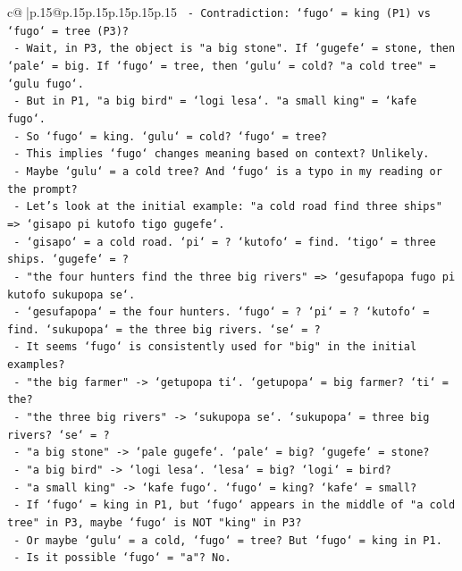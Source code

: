\documentclass{article}
\begin{document}
{\begin{supertabular}{c@{$\;$}|p{.15\linewidth}@{}p{.15\linewidth}p{.15\linewidth}p{.15\linewidth}p{.15\linewidth}p{.15\linewidth}}
{{{\texttt{  {-} Contradiction: `fugo` = king (P1) vs `fugo` = tree (P3)?} \\
\texttt{  {-} Wait, in P3, the object is "a big stone". If `gugefe` = stone, then `pale` = big. If `fugo` = tree, then `gulu` = cold? "a cold tree" = `gulu fugo`.} \\
\texttt{  {-} But in P1, "a big bird" = `logi lesa`. "a small king" = `kafe fugo`.} \\
\texttt{  {-} So `fugo` = king. `gulu` = cold? `fugo` = tree?} \\
\texttt{  {-} This implies `fugo` changes meaning based on context? Unlikely.} \\
\texttt{  {-} Maybe `gulu` = a cold tree? And `fugo` is a typo in my reading or the prompt?} \\
\texttt{  {-} Let's look at the initial example: "a cold road find three ships" => `gisapo pi kutofo tigo gugefe`.} \\
\texttt{    {-} `gisapo` = a cold road. `pi` = ? `kutofo` = find. `tigo` = three ships. `gugefe` = ?} \\
\texttt{  {-} "the four hunters find the three big rivers" => `gesufapopa fugo pi kutofo sukupopa se`.} \\
\texttt{    {-} `gesufapopa` = the four hunters. `fugo` = ? `pi` = ? `kutofo` = find. `sukupopa` = the three big rivers. `se` = ?} \\
\texttt{  {-} It seems `fugo` is consistently used for "big" in the initial examples?} \\
\texttt{    {-} "the big farmer" {-}> `getupopa ti`. `getupopa` = big farmer? `ti` = the?} \\
\texttt{    {-} "the three big rivers" {-}> `sukupopa se`. `sukupopa` = three big rivers? `se` = ?} \\
\texttt{    {-} "a big stone" {-}> `pale gugefe`. `pale` = big? `gugefe` = stone?} \\
\texttt{    {-} "a big bird" {-}> `logi lesa`. `lesa` = big? `logi` = bird?} \\
\texttt{    {-} "a small king" {-}> `kafe fugo`. `fugo` = king? `kafe` = small?} \\
\texttt{  {-} If `fugo` = king in P1, but `fugo` appears in the middle of "a cold tree" in P3, maybe `fugo` is NOT "king" in P3?} \\
\texttt{  {-} Or maybe `gulu` = a cold, `fugo` = tree? But `fugo` = king in P1.} \\
\texttt{  {-} Is it possible `fugo` = "a"? No.} \\
}}}
\end{supertabular}}
\end{document}
